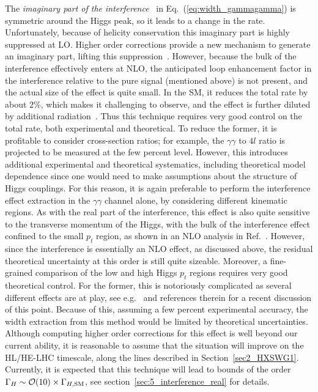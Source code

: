 The \emph{imaginary part of the interference}~\cite{Dixon:2013haa,Campbell:2017rke} 
in Eq.~(\ref{eq:width_gammagamma})
is symmetric around the Higgs peak, so it leads to a change in the rate. Unfortunately,
because of helicity conservation this imaginary part is highly suppressed at LO.
Higher order corrections provide a new mechanism to generate an imaginary part, lifting this suppression~\cite{Dixon:2013haa}.
However, because the bulk of the interference effectively enters at NLO,
the anticipated loop enhancement factor in the interference relative to the pure signal (mentioned above)
is not present, and the actual size of the effect is quite small. In the SM, 
it reduces the total rate by
about $2\%$, 
which makes it challenging to observe, and the effect is further diluted 
by additional radiation~\cite{Campbell:2017rke}. Thus this technique requires very good
control on the total rate, both experimental and theoretical. To reduce the former, it is 
profitable to consider cross-section ratios; for example, the $\gamma\gamma$ to $4l$ ratio
is projected to be measured at the few percent level.
However, this introduces additional experimental and theoretical systematics, including 
theoretical model dependence since one would need to make assumptions about the structure of Higgs 
couplings.
For this reason, it is again preferable to perform the interference effect extraction in 
the $\gamma\gamma$ channel alone,
by considering different kinematic regions.
%
As with the real part of the interference,  this effect is also quite sensitive to the transverse momentum of the Higgs, with the bulk of the interference effect confined to the small $p_t$ region, as shown in an NLO analysis in Ref.~\cite{Campbell:2017rke}. However, since the interference is essentially an NLO effect, as discussed above,  the residual theoretical uncertainty at this order is still quite sizeable. Moreover, a fine-grained comparison of the low and high 
Higgs $p_t$ regions requires very good theoretical control. For the former, this is notoriously
complicated as several different effects are at play, see e.g.~\cite{Caola:2018zye} and references 
therein for a recent discussion of this point. Because of this, 
assuming a few percent experimental accuracy, the width extraction from this method would be
limited by theoretical uncertainties. Although computing higher order corrections for this
effect is well beyond our current ability, it is reasonable to assume that the situation
will improve on the HL/HE-LHC timescale, along the lines described in Section~\ref{sec2_HXSWG1}.
Currently, it is expected that this technique will lead to bounds of the order
${\Gamma_H} \sim \mathcal O(10)\times {\Gamma_{H,{\rm SM}}}$, see section~\ref{sec:5_interference_real} for details. 

